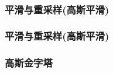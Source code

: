 \documentclass{beamer}
\begin{document}
{{\begin{frame}
{  \ }
\end{frame}}{\begin{frame}
  \frametitle{平滑与重采样(高斯平滑)}
  
  {\hspace{3em}}
\end{frame}}{\begin{frame}
  \frametitle{平滑与重采样(高斯平滑)}
  
  \qquad{}
\end{frame}}{\frametitle{高斯金字塔}

}}
\end{document}
